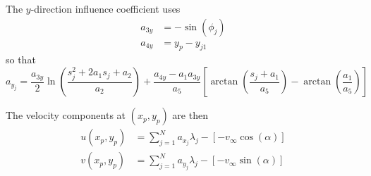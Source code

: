 The $y$-direction influence coefficient uses
\begin{align*}
    a_{3y} &= -\sin(\phi_j) \\
    a_{4y} &= y_p - y_{j1}
\end{align*}
so that
\[
    a_{y_{j}} = \frac{a_{3y}}{2} \ln\!\left(\frac{s_j^2 + 2 a_1 s_j + a_2}{a_2}\right) + \frac{a_{4y} - a_1 a_{3y}}{a_5}\left[\arctan\!\left(\frac{s_j + a_1}{a_5}\right) - \arctan\!\left(\frac{a_1}{a_5}\right)\right]
\]

The velocity components at $(x_p, y_p)$ are then
\begin{align*}
    u(x_p, y_p) &= \sum_{j=1}^{N} a_{x_{j}} \lambda_j - \left[-v_\infty \cos(\alpha)\right] \\
    v(x_p, y_p) &= \sum_{j=1}^{N} a_{y_{j}} \lambda_j - \left[-v_\infty \sin(\alpha)\right]
\end{align*}
